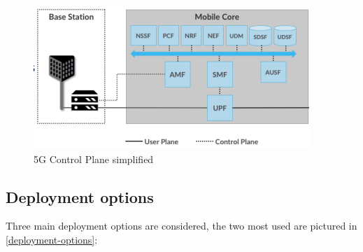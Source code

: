 \documentclass[10pt,a4paper]{report}
\theoremstyle{definition}
\begin{document}
\begin{figure}[h]
	\centering
	\includegraphics[scale=0.70]{images/Pasted image 20230309172235.png}
	\caption{5G Control Plane simplified}
	\label{5g-control-plane}
\end{figure}

\subsection{Deployment options}\label{sec:deployment-options}
Three main deployment options are considered, the two most used are pictured in \ref{deployment-options}:
\end{document}
